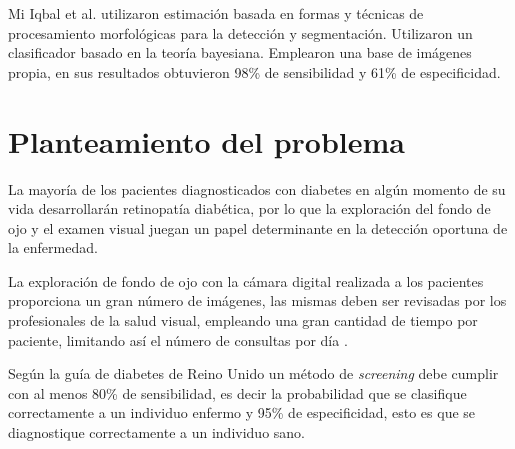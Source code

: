 Mi Iqbal et al. \cite{iqbal2006automatic} utilizaron estimación basada en formas y técnicas de procesamiento morfológicas para la detección y segmentación. Utilizaron un clasificador basado en la teoría bayesiana. Emplearon una base de imágenes propia, en sus resultados obtuvieron 98\% de sensibilidad y 61\% de especificidad.


\section{Planteamiento del problema}
La mayoría de los pacientes diagnosticados con diabetes en algún momento de su vida desarrollarán retinopatía diabética, por lo que la exploración del fondo de ojo y el examen visual juegan un papel determinante en la detección oportuna de la enfermedad. 


 La exploración de fondo de ojo con la cámara digital realizada a los pacientes proporciona un gran número de imágenes, las mismas  deben ser revisadas por los profesionales de la salud visual, empleando una gran cantidad de tiempo por paciente, limitando así el número de consultas por día \cite{selvathi2012automated}.
 
 
 Según la guía de diabetes de Reino Unido \cite{guide} un método de \textit{screening} debe cumplir con al menos  80\% de sensibilidad, es decir la probabilidad que se clasifique correctamente a un individuo enfermo y 95\% de especificidad, esto es que se diagnostique correctamente a un individuo sano.
 
 
 
 


